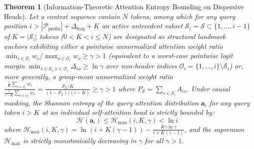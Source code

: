 \documentclass[conference,10pt]{IEEEtran}
\newtheorem{theorem}{Theorem}
\begin{document}
\begin{theorem}[Information-Theoretic Attention Entropy Bounding on Dispersive Heads]
\label{thm:entropy_bound}
Let a context sequence contain $N$ tokens, among which for any query position $i > |\mathcal{P}_{\text{prefix}}| + \Delta_{\text{frag}} + K$ an active antecedent subset $\mathcal{S}_i = \mathcal{S} \subset \{1, \dots, i-1\}$ of $K = |\mathcal{S}_i|$ tokens ($0 < K < i \le N$) are designated as structural landmark anchors exhibiting either a pointwise unnormalized attention weight ratio $\min_{s \in \mathcal{S}_i} w_s / \max_{o \in \mathcal{O}_i} w_o \ge \gamma > 1$ (equivalent to a worst-case pointwise logit margin $\min_{s \in \mathcal{S}_i, o \in \mathcal{O}_i} \Delta_{so} \ge \ln\gamma$ over non-header indices $\mathcal{O}_i = \{1, \dots, i\} \setminus \mathcal{S}_i$) or, more generally, a group-mean unnormalized weight ratio $\frac{\frac{1}{K}\sum_{s \in \mathcal{S}_i} w_s}{\frac{1}{i - K}\sum_{o \in \mathcal{O}_i} w_o} = \frac{P_{\mathcal{S}}/K}{(1 - P_{\mathcal{S}})/(i - K)} \ge \gamma > 1$ where $P_{\mathcal{S}} = \sum_{s \in \mathcal{S}_i} A_{is}$. Under causal masking, the Shannon entropy of the query attention distribution $\mathbf{a}_i$ for any query token $i > K$ at an individual self-attention head is strictly bounded by:
\begin{equation}
\label{eq:entropy_bound}
\mathcal{H}(\mathbf{a}_i) \le \mathcal{H}_{\max}(i, K, \gamma) < \ln i
\end{equation}
where $\mathcal{H}_{\max}(i, K, \gamma) = \ln(i + K(\gamma - 1)) - \frac{K\gamma \ln\gamma}{i + K(\gamma - 1)}$, and the supremum $\mathcal{H}_{\max}$ is strictly monotonically decreasing in $\gamma$ for all $\gamma > 1$.
\end{theorem}
\end{document}
